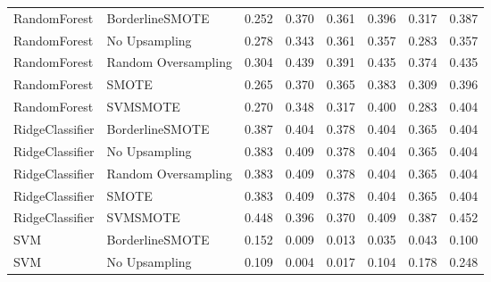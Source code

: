 \begin{tabular}{llllllll}
                RandomForest &     BorderlineSMOTE & 0.252 &                     0.370 &                 0.361 &                  0.396 &                                   0.317 &     0.387 \\
                RandomForest &       No Upsampling & 0.278 &                     0.343 &                 0.361 &                  0.357 &                                   0.283 &     0.357 \\
                RandomForest & Random Oversampling & 0.304 &                     0.439 &                 0.391 &                  0.435 &                                   0.374 &     0.435 \\
                RandomForest &               SMOTE & 0.265 &                     0.370 &                 0.365 &                  0.383 &                                   0.309 &     0.396 \\
                RandomForest &            SVMSMOTE & 0.270 &                     0.348 &                 0.317 &                  0.400 &                                   0.283 &     0.404 \\
             RidgeClassifier &     BorderlineSMOTE & 0.387 &                     0.404 &                 0.378 &                  0.404 &                                   0.365 &     0.404 \\
             RidgeClassifier &       No Upsampling & 0.383 &                     0.409 &                 0.378 &                  0.404 &                                   0.365 &     0.404 \\
             RidgeClassifier & Random Oversampling & 0.383 &                     0.409 &                 0.378 &                  0.404 &                                   0.365 &     0.404 \\
             RidgeClassifier &               SMOTE & 0.383 &                     0.409 &                 0.378 &                  0.404 &                                   0.365 &     0.404 \\
             RidgeClassifier &            SVMSMOTE & 0.448 &                     0.396 &                 0.370 &                  0.409 &                                   0.387 &     0.452 \\
                         SVM &     BorderlineSMOTE & 0.152 &                     0.009 &                 0.013 &                  0.035 &                                   0.043 &     0.100 \\
                         SVM &       No Upsampling & 0.109 &                     0.004 &                 0.017 &                  0.104 &                                   0.178 &     0.248 \\

\end{tabular}
